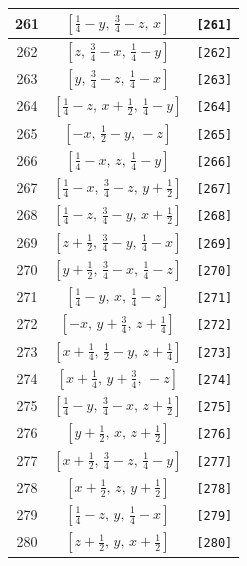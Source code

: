 \documentclass[fleqn,8pt]{jsarticle}
\begin{document}
\begin{longtable}{ccc}
261 & $\left[ \frac{1}{4} - y,\, \frac{3}{4} - z,\, x \right]$ & {\tt [261]} \\ \hline
262 & $\left[ z,\, \frac{3}{4} - x,\, \frac{1}{4} - y \right]$ & {\tt [262]} \\ \hline
263 & $\left[ y,\, \frac{3}{4} - z,\, \frac{1}{4} - x \right]$ & {\tt [263]} \\ \hline
264 & $\left[ \frac{1}{4} - z,\, x + \frac{1}{2},\, \frac{1}{4} - y \right]$ & {\tt [264]} \\ \hline
265 & $\left[ - x,\, \frac{1}{2} - y,\, - z \right]$ & {\tt [265]} \\ \hline
266 & $\left[ \frac{1}{4} - x,\, z,\, \frac{1}{4} - y \right]$ & {\tt [266]} \\ \hline
267 & $\left[ \frac{1}{4} - x,\, \frac{3}{4} - z,\, y + \frac{1}{2} \right]$ & {\tt [267]} \\ \hline
268 & $\left[ \frac{1}{4} - z,\, \frac{3}{4} - y,\, x + \frac{1}{2} \right]$ & {\tt [268]} \\ \hline
269 & $\left[ z + \frac{1}{2},\, \frac{3}{4} - y,\, \frac{1}{4} - x \right]$ & {\tt [269]} \\ \hline
270 & $\left[ y + \frac{1}{2},\, \frac{3}{4} - x,\, \frac{1}{4} - z \right]$ & {\tt [270]} \\ \hline
271 & $\left[ \frac{1}{4} - y,\, x,\, \frac{1}{4} - z \right]$ & {\tt [271]} \\ \hline
272 & $\left[ - x,\, y + \frac{3}{4},\, z + \frac{1}{4} \right]$ & {\tt [272]} \\ \hline
273 & $\left[ x + \frac{1}{4},\, \frac{1}{2} - y,\, z + \frac{1}{4} \right]$ & {\tt [273]} \\ \hline
274 & $\left[ x + \frac{1}{4},\, y + \frac{3}{4},\, - z \right]$ & {\tt [274]} \\ \hline
275 & $\left[ \frac{1}{4} - y,\, \frac{3}{4} - x,\, z + \frac{1}{2} \right]$ & {\tt [275]} \\ \hline
276 & $\left[ y + \frac{1}{2},\, x,\, z + \frac{1}{2} \right]$ & {\tt [276]} \\ \hline
277 & $\left[ x + \frac{1}{2},\, \frac{3}{4} - z,\, \frac{1}{4} - y \right]$ & {\tt [277]} \\ \hline
278 & $\left[ x + \frac{1}{2},\, z,\, y + \frac{1}{2} \right]$ & {\tt [278]} \\ \hline
279 & $\left[ \frac{1}{4} - z,\, y,\, \frac{1}{4} - x \right]$ & {\tt [279]} \\ \hline
280 & $\left[ z + \frac{1}{2},\, y,\, x + \frac{1}{2} \right]$ & {\tt [280]} \\ \hline

\end{longtable}
\end{document}
